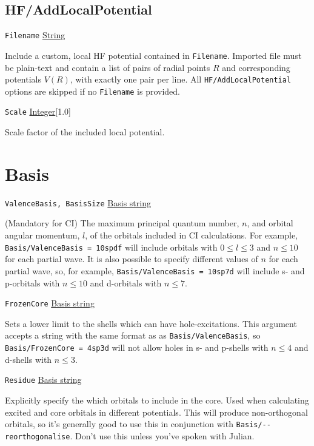 \documentclass{report}
\begin{document}
\subsection{HF/AddLocalPotential}

\texttt{Filename} \uline{String}
\begin{adjustwidth}{1cm}{}
Include a custom, local HF potential contained in \texttt{Filename}. Imported file must be plain-text
and contain a list of pairs of radial points $R$ and corresponding potentials $V(R)$, with exactly one
pair per line. All \texttt{HF/AddLocalPotential} options are skipped if no \texttt{Filename} is provided.
\end{adjustwidth}

\texttt{Scale} \uline{Integer}[1.0]
\begin{adjustwidth}{1cm}{}
Scale factor of the included local potential.
\end{adjustwidth}

\section{Basis}

\texttt{ValenceBasis, BasisSize} \uline{Basis string}
\begin{adjustwidth}{1cm}{}
(Mandatory for CI) The maximum principal quantum number, $n$, and orbital angular momentum, $l$, of
the orbitals included in CI calculations. For example, 
\texttt{Basis/ValenceBasis = 10spdf} will include orbitals with $0 \leq l \leq 3$ and $n \leq 10$ for
each partial wave. It is also possible to specify different values of $n$ for each partial wave, so, for
example, \texttt{Basis/ValenceBasis = 10sp7d} will include s- and p-orbitals with $n \leq 10$ and
d-orbitals with $n \leq 7$.
\end{adjustwidth}

\texttt{FrozenCore} \uline{Basis string}
\begin{adjustwidth}{1cm}{}
Sets a lower limit to the shells which can have hole-excitations. This argument accepts a string with
the same format as as \texttt{Basis/ValenceBasis}, so \texttt{Basis/FrozenCore = 4sp3d} will not allow 
holes in s- and p-shells with $n \leq 4$ and d-shells with $n \leq 3$.
\end{adjustwidth}

\texttt{Residue} \uline{Basis string}
\begin{adjustwidth}{1cm}{}
Explicitly specify the which orbitals to include in the core. Used when calculating excited and core
orbitals in different potentials. This will produce non-orthogonal orbitals, so it's generally good to
use this in conjunction with \texttt{Basis/{-}{-}reorthogonalise}. Don't use this unless you've spoken
with Julian.
\end{adjustwidth}
\end{document}
